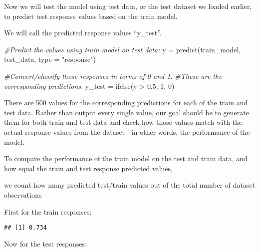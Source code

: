 \documentclass[
]{article}
\newenvironment{Shaded}{\begin{snugshade}}{\end{snugshade}}
\newcommand{\AttributeTok}[1]{\textcolor[rgb]{0.77,0.63,0.00}{#1}}
\newcommand{\CommentTok}[1]{\textcolor[rgb]{0.56,0.35,0.01}{\textit{#1}}}
\newcommand{\DecValTok}[1]{\textcolor[rgb]{0.00,0.00,0.81}{#1}}
\newcommand{\FloatTok}[1]{\textcolor[rgb]{0.00,0.00,0.81}{#1}}
\newcommand{\FunctionTok}[1]{\textcolor[rgb]{0.00,0.00,0.00}{#1}}
\newcommand{\NormalTok}[1]{#1}
\newcommand{\OtherTok}[1]{\textcolor[rgb]{0.56,0.35,0.01}{#1}}
\newcommand{\SpecialCharTok}[1]{\textcolor[rgb]{0.00,0.00,0.00}{#1}}
\newcommand{\StringTok}[1]{\textcolor[rgb]{0.31,0.60,0.02}{#1}}
\begin{document}
Now we will test the model using test data, or the test dataset we
loaded earlier, to predict test response values based on the train
model.

We will call the predicted response values ``y\_test''.

\begin{Shaded}
\begin{Highlighting}[]
\CommentTok{\#Predict the values using train model on test data:}
\NormalTok{y }\OtherTok{=} \FunctionTok{predict}\NormalTok{(train\_model, test\_data, }\AttributeTok{type =} \StringTok{"response"}\NormalTok{)}

\CommentTok{\#Convert/classify those responses in terms of 0 and 1.}
\CommentTok{\#These are the corresponding predictions.}
\NormalTok{y\_test }\OtherTok{=} \FunctionTok{ifelse}\NormalTok{(y }\SpecialCharTok{\textgreater{}} \FloatTok{0.5}\NormalTok{, }\DecValTok{1}\NormalTok{, }\DecValTok{0}\NormalTok{)}
\end{Highlighting}
\end{Shaded}

There are 500 values for the corresponding predictions for each of the
train and test data. Rather than output every single value, our goal
should be to generate them for both train and test data and check how
those values match with the actual response values from the dataset - in
other words, the performance of the model.

To compare the performance of the train model on the test and train
data, and how equal the train and test response predicted values,

we count how many predicted test/train values out of the total number of
dataset observations

First for the train responses:

\begin{Shaded}
\end{Shaded}

\begin{verbatim}
## [1] 0.734
\end{verbatim}

Now for the test responses:

\begin{Shaded}
\end{Shaded}
\end{document}

